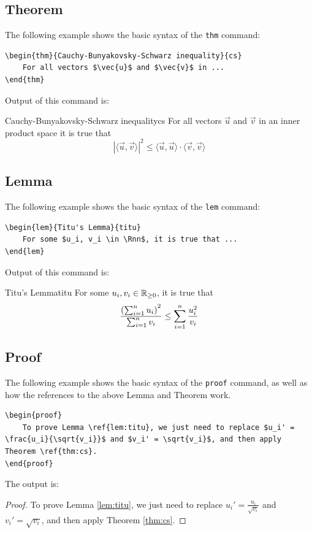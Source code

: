 \documentclass[letterpaper,11pt]{notes}
\theoremstyle{definition}
\theoremstyle{plain}
\theoremstyle{remark}
\begin{document}
\subsection{Theorem}
The following example shows the basic syntax of the \texttt{thm} command:
\begin{verbatim}
\begin{thm}{Cauchy-Bunyakovsky-Schwarz inequality}{cs}
    For all vectors $\vec{u}$ and $\vec{v}$ in ...
\end{thm}
\end{verbatim}
Output of this command is:

\begin{thm}{Cauchy-Bunyakovsky-Schwarz inequality}{cs}
For all vectors $\vec{u}$ and $\vec{v}$ in an inner product space it is true that
\begin{equation}
    \left|\langle\vec{u}, \vec{v}\rangle\right|^2 \leq \langle\vec{u}, \vec{u} \rangle \cdot \langle\vec{v}, \vec{v} \rangle 
\end{equation}
\end{thm}

\subsection{Lemma}
The following example shows the basic syntax of the \texttt{lem} command:
\begin{verbatim}
\begin{lem}{Titu's Lemma}{titu}
    For some $u_i, v_i \in \Rnn$, it is true that ...
\end{lem}
\end{verbatim}
Output of this command is:
\begin{lem}{Titu's Lemma}{titu}
For some $u_i, v_i \in \mathbb{R}_{\geq 0}$, it is true that
\begin{equation}
    \frac{\left(\sum_{i=1}^n u_i\right)^2}{\sum_{i=1}^n v_i} \leq \sum_{i=1}^n \frac{u_i^2}{v_i}
\end{equation}
\end{lem}

\subsection{Proof}
The following example shows the basic syntax of the \texttt{proof} command, as well as how the references to the above Lemma and Theorem work.
\begin{verbatim}
\begin{proof}
    To prove Lemma \ref{lem:titu}, we just need to replace $u_i' = \frac{u_i}{\sqrt{v_i}}$ and $v_i' = \sqrt{v_i}$, and then apply Theorem \ref{thm:cs}. 
\end{proof}
\end{verbatim}
The output is:
\begin{proof}
To prove Lemma \ref{lem:titu}, we just need to replace $u_i' = \frac{u_i}{\sqrt{v_i}}$ and $v_i' = \sqrt{v_i}$, and then apply Theorem \ref{thm:cs}. 
\end{proof}
\end{document}
